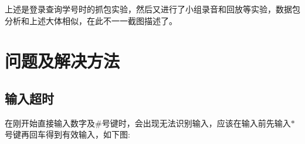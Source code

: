\documentclass[a4paper,AutoFakeBold,oneside,12pt]{book}
\begin{document}
上述是登录查询学号时的抓包实验，然后又进行了小组录音和回放等实验，数据包分析和上述大体相似，在此不一一截图描述了。

\section{问题及解决方法}
\subsection{输入超时}
在刚开始直接输入数字及$\#$号键时，会出现无法识别输入，应该在输入前先输入$*$号键再回车得到有效输入，如下图:







\end{document}
